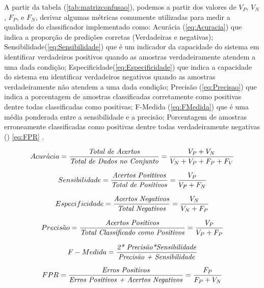 A partir da tabela (\ref{tab:matrizconfusao}), podemos  a partir dos valores de $V_P$, $V_N$, $F_P$, e $F_N$, derivar algumas métricas comumente utilizadas para medir a qualidade do classificador implementado como: Acurácia (\ref{eq:Acuracia}) que indica a proporção de predições corretas (Verdadeiras e negativas); Sensibilidade(\ref{eq:Sensibilidade}) que é um indicador da capacidade do sistema em identificar verdadeiros positivos quando as amostras verdadeiramente atendem a uma dada condição; Especificidade(\ref{eq:Especificidade}) que indica a capacidade do sistema em identificar verdadeiros negativos quando as amostras verdadeiramente não atendem a uma dada condição; Precisão (\ref{eq:Precisao}) que indica a porcentagem de amostras classificadas corretamente como positivas dentre todas classificadas como positivas; F-Medida (\ref{eq:FMedida}) que é uma média ponderada entre a sensibilidade e a precisão; Porcentagem de amostras erroneamente classificadas como positivas dentre todas verdadeiramente negativas () \eqref{eq:FPR} \cite{kohavi1998glossary}. 

\begin{equation}
Acur\acute{a}cia =\frac{\textrm{\textit{Total de Acertos}}}{\textrm{\textit{Total de Dados no Conjunto}}} \\
=\frac{V_P + V_N}{V_N+V_P+F_P+F_V}
\label{eq:Acuracia}
\end{equation}

\begin{equation}
Sensibilidade =\frac{\textrm{\textit{Acertos Positivos}}}{\textrm{\textit{Total de Positivos}}} \\
=\frac{V_P}{V_P+F_N}
\label{eq:Sensibilidade}
\end{equation}

\begin{equation}
Especificidade =\frac{\textrm{\textit{Acertos Negativos}}}{\textrm{\textit{Total Negativos}}} \\
=\frac{V_N}{V_N+F_P}
\label{eq:Especificidade}
\end{equation}

\begin{equation}
Precis\tilde{a}o =\frac{\textrm{\textit{Acertos Positivos}}}{\textrm{\textit{Total Classificado como Positivos}}} \\
=\frac{V_P}{V_P+F_P}
\label{eq:Precisao}
\end{equation} 

\begin{equation}
F-Medida =\frac{\textrm{\textit{2* Precisão*Sensibilidade}}}{\textrm{\textit{Precisão + Sensibilidade}}} 
\label{eq:FMedida}
\end{equation} 

\begin{equation}
FPR =\frac{\textrm{\textit{Erros Positivos}}}{\textrm{\textit{Erros Positivos + Acertos Negativos}}}\\
=\frac{F_P}{F_P + V_N} 
\label{eq:FPR}
\end{equation}  
      
   





   
